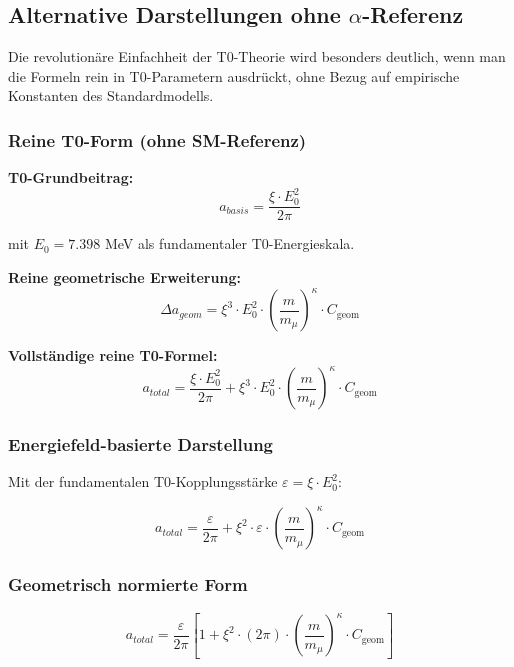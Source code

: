 \documentclass[12pt,a4paper]{article}
\numberwithin{equation}{section}
\newcommand{\xipar}{\xi}
\newcommand{\Cgeom}{C_{\text{geom}}}
\newcommand{\kappaT}{\kappa}
\newcommand{\mmu}{m_{\mu}}
\begin{document}
	\subsection{Alternative Darstellungen ohne $\alpha$-Referenz}
	
	Die revolutionäre Einfachheit der T0-Theorie wird besonders deutlich, wenn man die Formeln rein in T0-Parametern ausdrückt, ohne Bezug auf empirische Konstanten des Standardmodells.
	
	\subsubsection{Reine T0-Form (ohne SM-Referenz)}
	
	\textbf{T0-Grundbeitrag:}
	\begin{equation}
		a_{basis} = \frac{\xipar \cdot E_0^2}{2\pi}
	\end{equation}
	
	mit $E_0 = 7.398$ MeV als fundamentaler T0-Energieskala.
	
	\textbf{Reine geometrische Erweiterung:}
	\begin{equation}
		\Delta a_{geom} = \xipar^3 \cdot E_0^2 \cdot \left(\frac{m}{\mmu}\right)^\kappaT \cdot \Cgeom
	\end{equation}
	
	\textbf{Vollständige reine T0-Formel:}
	\begin{equation}
		\boxed{a_{total} = \frac{\xipar \cdot E_0^2}{2\pi} + \xipar^3 \cdot E_0^2 \cdot \left(\frac{m}{\mmu}\right)^\kappaT \cdot \Cgeom}
	\end{equation}
	
	\subsubsection{Energiefeld-basierte Darstellung}
	
	Mit der fundamentalen T0-Kopplungsstärke $\varepsilon = \xipar \cdot E_0^2$:
	
	\begin{equation}
		\boxed{a_{total} = \frac{\varepsilon}{2\pi} + \xipar^2 \cdot \varepsilon \cdot \left(\frac{m}{\mmu}\right)^\kappaT \cdot \Cgeom}
	\end{equation}
	
	\subsubsection{Geometrisch normierte Form}
	
	\begin{equation}
		\boxed{a_{total} = \frac{\varepsilon}{2\pi} \left[1 + \xipar^2 \cdot (2\pi) \cdot \left(\frac{m}{\mmu}\right)^\kappaT \cdot \Cgeom\right]}
	\end{equation}
	
\end{document}
